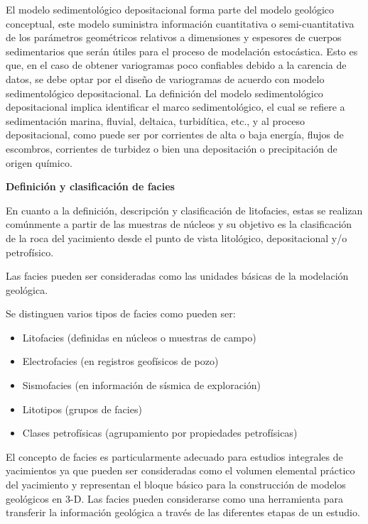 El modelo sedimentol\'ogico depositacional forma parte del modelo geol\'ogico conceptual, este modelo suministra informaci\'on cuantitativa o semi-cuantitativa de los par\'ametros geom\'etricos relativos a dimensiones y espesores de cuerpos sedimentarios que ser\'an \'utiles para el proceso de modelaci\'on estoc\'astica. Esto es que, en el caso de obtener variogramas poco confiables debido a la carencia de datos, se debe optar por el dise\~no de variogramas de acuerdo con modelo sedimentol\'ogico depositacional.
La definici\'on del modelo sedimentol\'ogico depositacional implica identificar el marco sedimentol\'ogico, el cual se refiere a sedimentaci\'on marina, fluvial, deltaica, turbid\'itica, etc., y al proceso depositacional, como puede ser por corrientes de alta o baja energ\'ia, flujos de escombros, corrientes de turbidez o bien una depositaci\'on o precipitaci\'on de origen qu\'imico.

\textbf{Definici\'on y clasificaci\'on de facies}

En cuanto a la definici\'on, descripci\'on y clasificaci\'on de litofacies, estas se realizan com\'unmente a partir de las muestras de n\'ucleos y su objetivo es la clasificaci\'on de la roca del yacimiento desde el punto de vista litol\'ogico, depositacional y/o petrof\'isico.

Las facies pueden ser consideradas como las unidades b\'asicas de la modelaci\'on geol\'ogica. 

Se distinguen varios tipos de facies como pueden ser:
\begin{itemize}
    \item Litofacies (definidas en n\'ucleos o muestras de campo)
    \item Electrofacies (en registros geof\'isicos de pozo)
    \item Sismofacies (en informaci\'on de s\'ismica de exploraci\'on)
    \item Litotipos (grupos de facies) 
    \item Clases petrof\'isicas (agrupamiento por propiedades petrof\'isicas)
\end{itemize}

El concepto de facies es particularmente adecuado para estudios integrales de yacimientos ya que pueden ser consideradas como el volumen elemental pr\'actico del yacimiento y representan el bloque b\'asico para la construcci\'on de modelos geol\'ogicos en 3-D. Las facies pueden considerarse como una herramienta para transferir la informaci\'on geol\'ogica a trav\'es de las diferentes etapas de un estudio.


